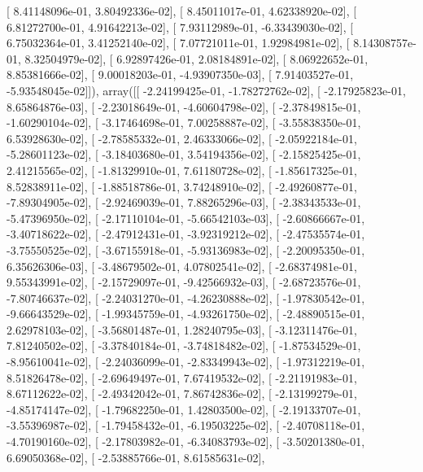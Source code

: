 \documentclass{article}
\begin{document}
       [  8.41148096e-01,   3.80492336e-02],
       [  8.45011017e-01,   4.62338920e-02],
       [  6.81272700e-01,   4.91642213e-02],
       [  7.93112989e-01,  -6.33439030e-02],
       [  6.75032364e-01,   3.41252140e-02],
       [  7.07721011e-01,   1.92984981e-02],
       [  8.14308757e-01,   8.32504979e-02],
       [  6.92897426e-01,   2.08184891e-02],
       [  8.06922652e-01,   8.85381666e-02],
       [  9.00018203e-01,  -4.93907350e-03],
       [  7.91403527e-01,  -5.93548045e-02]]), array([[ -2.24199425e-01,  -1.78272762e-02],
       [ -2.17925823e-01,   8.65864876e-03],
       [ -2.23018649e-01,  -4.60604798e-02],
       [ -2.37849815e-01,  -1.60290104e-02],
       [ -3.17464698e-01,   7.00258887e-02],
       [ -3.55838350e-01,   6.53928630e-02],
       [ -2.78585332e-01,   2.46333066e-02],
       [ -2.05922184e-01,  -5.28601123e-02],
       [ -3.18403680e-01,   3.54194356e-02],
       [ -2.15825425e-01,   2.41215565e-02],
       [ -1.81329910e-01,   7.61180728e-02],
       [ -1.85617325e-01,   8.52838911e-02],
       [ -1.88518786e-01,   3.74248910e-02],
       [ -2.49260877e-01,  -7.89304905e-02],
       [ -2.92469039e-01,   7.88265296e-03],
       [ -2.38343533e-01,  -5.47396950e-02],
       [ -2.17110104e-01,  -5.66542103e-03],
       [ -2.60866667e-01,  -3.40718622e-02],
       [ -2.47912431e-01,  -3.92319212e-02],
       [ -2.47535574e-01,  -3.75550525e-02],
       [ -3.67155918e-01,  -5.93136983e-02],
       [ -2.20095350e-01,   6.35626306e-03],
       [ -3.48679502e-01,   4.07802541e-02],
       [ -2.68374981e-01,   9.55343991e-02],
       [ -2.15729097e-01,  -9.42566932e-03],
       [ -2.68723576e-01,  -7.80746637e-02],
       [ -2.24031270e-01,  -4.26230888e-02],
       [ -1.97830542e-01,  -9.66643529e-02],
       [ -1.99345759e-01,  -4.93261750e-02],
       [ -2.48890515e-01,   2.62978103e-02],
       [ -3.56801487e-01,   1.28240795e-03],
       [ -3.12311476e-01,   7.81240502e-02],
       [ -3.37840184e-01,  -3.74818482e-02],
       [ -1.87534529e-01,  -8.95610041e-02],
       [ -2.24036099e-01,  -2.83349943e-02],
       [ -1.97312219e-01,   8.51826478e-02],
       [ -2.69649497e-01,   7.67419532e-02],
       [ -2.21191983e-01,   8.67112622e-02],
       [ -2.49342042e-01,   7.86742836e-02],
       [ -2.13199279e-01,  -4.85174147e-02],
       [ -1.79682250e-01,   1.42803500e-02],
       [ -2.19133707e-01,  -3.55396987e-02],
       [ -1.79458432e-01,  -6.19503225e-02],
       [ -2.40708118e-01,  -4.70190160e-02],
       [ -2.17803982e-01,  -6.34083793e-02],
       [ -3.50201380e-01,   6.69050368e-02],
       [ -2.53885766e-01,   8.61585631e-02],
\end{document}

